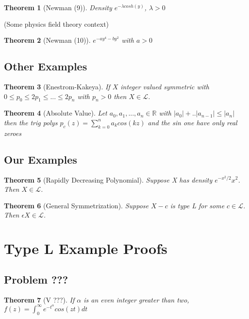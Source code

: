 \documentclass[10pt]{article}
\newcommand{\1}{\textbf{1}}
\newcommand{\R}{\mathbb{R}}
\newcommand{\lL}{\mathcal{L}}
\newtheorem{theorem}{Theorem}
\theoremstyle{remark}
\theoremstyle{definition}
\begin{document}
\begin{theorem}[Newman (9)] \label{N9}
	Density $e^{-\lambda cosh(y)}$, $\lambda >0$
\end{theorem}

(Some physics field theory context)

\begin{theorem}[Newman (10)] \label{N10}
	$e^{-ay^4-by^2}$ with $a>0$
\end{theorem}

\subsection{Other Examples}

\begin{theorem}[Enestrom-Kakeya] \label{them:EK}
	If $X$ integer valued symmetric with $0\leq p_0 \leq 2 p_1 \leq ... \leq 2p_n$ with $p_n >0$ then $X \in \lL$.
\end{theorem}

\begin{theorem}[Absolute Value] \label{them:ABS}
	Let $a_0,a_1,...,a_n \in \R$ with $|a_0| + .. | a_{n-1}| \leq |a_n|$ then the trig polys $p_c(z) = \sum_{k=0}^n a_k cos(kz)$ and the sin one have only real zeroes
\end{theorem}

\subsection{Our Examples}

\begin{theorem}[Rapidly Decreasing Polynomial] \label{RDP}
	Suppose X has density $e^{-x^2/2}x^2$. Then $X \in \lL$.
\end{theorem}

\begin{theorem}[General Symmetrization] \label{GSYM}
	Suppose $X -c$ is type L for some $c \in \lL$. Then $\epsilon X \in \lL$.
\end{theorem}


\section{Type L Example Proofs}

\subsection{Problem ???}

\begin{theorem}[V ???]
	If $\alpha$ is an even integer greater than two, $f(z) = \int_0^{\infty} e^{-t^{\alpha}}cos(zt)dt$
\end{theorem}
\end{document}
